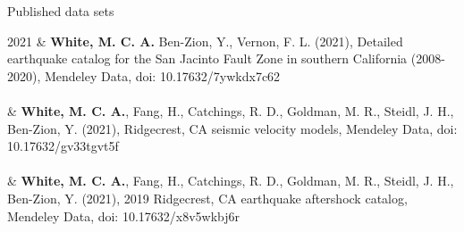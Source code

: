\begin{rSection}{Published data sets}
	\begin{timeline}
		2021 
			&
			\textbf{White, M. C. A.} Ben-Zion, Y., Vernon, F. L. (2021), Detailed earthquake catalog for the San Jacinto Fault Zone in southern California (2008-2020), Mendeley Data, doi: 10.17632/7ywkdx7c62 \\ \\
			& \textbf{White, M. C. A.}, Fang, H., Catchings, R. D., Goldman, M. R., Steidl, J. H., Ben-Zion, Y. (2021), Ridgecrest, CA seismic velocity models, Mendeley Data, doi: 10.17632/gv33tgvt5f \\ \\
		
			& \textbf{White, M. C. A.}, Fang, H., Catchings, R. D., Goldman, M. R., Steidl, J. H., Ben-Zion, Y. (2021), 2019 Ridgecrest, CA earthquake aftershock catalog, Mendeley Data, doi: 10.17632/x8v5wkbj6r \\ \\
	\end{timeline}
\end{rSection}
